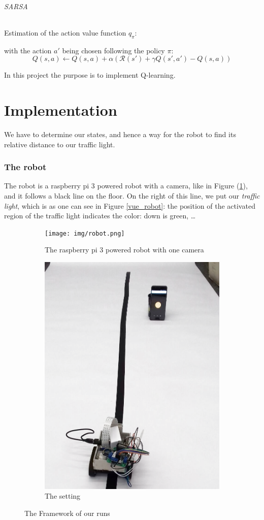 \documentclass[14pt,a4paper]{article}
\theoremstyle{definition}
\begin{document}
\paragraph{SARSA} Estimation of the action value function $q_{\pi}$:

with the action $a'$ being chosen following the policy $\pi$:
\begin{equation}
Q(s,a) \leftarrow Q(s,a) + \alpha \left( \mathcal{R}(s') + \gamma Q(s',a') - Q(s,a) \right)
\end{equation}


In this project the purpose is to implement Q-learning.



\newpage
\part*{Implementation}
We have to determine our states, and hence a way for the robot to find its relative distance to our traffic light.
\section{The robot}
The robot is a raspberry pi 3 powered robot with a camera, like in Figure (\ref{fig:sub1}), and it follows a black line on the floor. On the right of this line, we put our \emph{traffic light}, which is as one can see in Figure \ref{vue_robot}: the position of the activated region of the traffic light indicates the color: down is green, \ldots

\begin{figure}[H]
\centering
\begin{subfigure}{.5\textwidth}
  \centering
  \texttt{[image: img/robot.png]}
  \caption{The raspberry pi 3 powered robot with one camera}
  \label{fig:sub1}
\end{subfigure}%
\begin{subfigure}{.5\textwidth}
  \centering
  \includegraphics[width=.5\linewidth]{img/setting1_mod1.png}
  \caption{The setting}
  \label{fig:sub2}
\end{subfigure}
\caption{The Framework of our runs}
\label{fig:test}
\end{figure}
\end{document}
